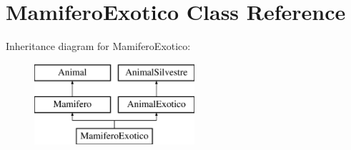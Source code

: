 \hypertarget{class_mamifero_exotico}{}\section{Mamifero\+Exotico Class Reference}
\label{class_mamifero_exotico}
Inheritance diagram for Mamifero\+Exotico\+:\begin{figure}[H]
\begin{center}
\leavevmode
\includegraphics[height=3.000000cm]{class_mamifero_exotico}
\end{center}
\end{figure}
